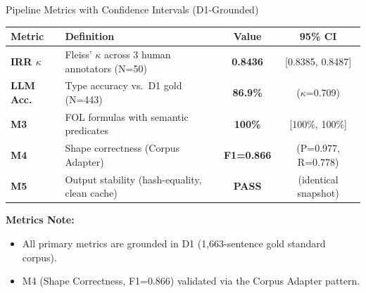 \documentclass[aspectratio=169, 10pt]{beamer}
\begin{document}
\begin{frame}{Pipeline Metrics with Confidence Intervals (D1-Grounded)}
    \begin{table}[]
        \centering
        \begin{tabular}{llcc}
            \toprule
            \textbf{Metric} & \textbf{Definition} & \textbf{Value} & \textbf{95\% CI} \\
            \midrule
            \textbf{IRR $\kappa$} & Fleiss' $\kappa$ across 3 human annotators (N=50) & \textbf{0.8436} & [0.8385, 0.8487] \\
            \textbf{LLM Acc.} & Type accuracy vs.\ D1 gold (N=443) & \textbf{86.9\%} & ($\kappa$=0.709) \\
            \textbf{M3} & FOL formulas with semantic predicates & \textbf{100\%} & [100\%, 100\%] \\
            \textbf{M4} & Shape correctness (Corpus Adapter) & \textbf{F1=0.866} & (P=0.977, R=0.778) \\
            \textbf{M5} & Output stability (hash-equality, clean cache) & \textbf{PASS} & (identical snapshot) \\
            \bottomrule
        \end{tabular}
    \end{table}
    
    \vspace{0.3cm}
    \textbf{Metrics Note:}
    \begin{itemize}
        \item All primary metrics are grounded in D1 (1,663-sentence gold standard corpus).
        \item M4 (Shape Correctness, F1=0.866) validated via the Corpus Adapter pattern.
    \end{itemize}
\end{frame}
\end{document}
